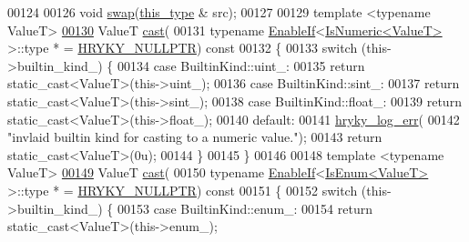 \begin{DoxyCode}
00124 
00126     \textcolor{keywordtype}{void} \hyperlink{classhryky_1_1_any_a1603aaa3243f8aaae407c6a5e4287bb6}{swap}(\hyperlink{classhryky_1_1_any}{this_type} & src);
00127 
00129     \textcolor{keyword}{template} <\textcolor{keyword}{typename} ValueT>
\hypertarget{any_8h_source_l00130}{}\hyperlink{classhryky_1_1_any_ac0e23acd8cc393f4f9c4188229cb9c9e}{00130}     ValueT \hyperlink{classhryky_1_1_any_ac0e23acd8cc393f4f9c4188229cb9c9e}{cast}(
00131         \textcolor{keyword}{typename} \hyperlink{classhryky_1_1_enable_if}{EnableIf}<\hyperlink{classhryky_1_1_is_numeric}{IsNumeric<ValueT>} >::type * = \hyperlink{common_8h_a4cd4ac09cfcdbd6b30ee69afc156e210}{HRYKY_NULLPTR})\textcolor{keyword}{ const}
00132 \textcolor{keyword}{    }\{
00133         \textcolor{keywordflow}{switch} (this->builtin\_kind\_) \{
00134         \textcolor{keywordflow}{case} BuiltinKind::uint\_:
00135             \textcolor{keywordflow}{return} \textcolor{keyword}{static\_cast<}ValueT\textcolor{keyword}{>}(this->uint\_);
00136         \textcolor{keywordflow}{case} BuiltinKind::sint\_:
00137             \textcolor{keywordflow}{return} \textcolor{keyword}{static\_cast<}ValueT\textcolor{keyword}{>}(this->sint\_);
00138         \textcolor{keywordflow}{case} BuiltinKind::float\_:
00139             \textcolor{keywordflow}{return} \textcolor{keyword}{static\_cast<}ValueT\textcolor{keyword}{>}(this->float\_);
00140         \textcolor{keywordflow}{default}:
00141             \hyperlink{log__writer__common_8h_ae5ad3dabb33f594695ef40753cb78aad}{hryky_log_err}(
00142                 \textcolor{stringliteral}{"invlaid builtin kind for casting to a numeric value."});
00143             \textcolor{keywordflow}{return} \textcolor{keyword}{static\_cast<}ValueT\textcolor{keyword}{>}(0u);
00144         \}
00145     \}
00146 
00148     \textcolor{keyword}{template} <\textcolor{keyword}{typename} ValueT>
\hypertarget{any_8h_source_l00149}{}\hyperlink{classhryky_1_1_any_a37e3de98575a1b8c72a0fb7f5df978b7}{00149}     ValueT \hyperlink{classhryky_1_1_any_ac0e23acd8cc393f4f9c4188229cb9c9e}{cast}(
00150         \textcolor{keyword}{typename} \hyperlink{classhryky_1_1_enable_if}{EnableIf}<\hyperlink{classhryky_1_1_is_enum}{IsEnum<ValueT>} >::type * = \hyperlink{common_8h_a4cd4ac09cfcdbd6b30ee69afc156e210}{HRYKY_NULLPTR})\textcolor{keyword}{ const}
00151 \textcolor{keyword}{    }\{
00152         \textcolor{keywordflow}{switch} (this->builtin\_kind\_) \{
00153         \textcolor{keywordflow}{case} BuiltinKind::enum\_:
00154             \textcolor{keywordflow}{return} \textcolor{keyword}{static\_cast<}ValueT\textcolor{keyword}{>}(this->enum\_);

\end{DoxyCode}
